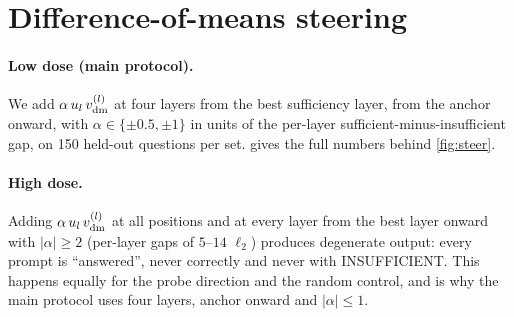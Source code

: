 \section{Difference-of-means steering}
\label{app:steer-dm}
\paragraph{Low dose (main protocol).} We add $\alpha\,u_l\,v_{\mathrm{dm}}^{(l)}$ at four layers from the best sufficiency layer, from the anchor onward, with $\alpha\in\{\pm0.5,\pm1\}$ in units of the per-layer sufficient-minus-insufficient gap, on 150 held-out questions per set.  gives the full numbers behind \cref{fig:steer}.
\begin{table}[h]
\centering\small

\caption{Low-dose steering along $\vdm$ (150 held-out questions per set). Baselines ($\alpha=0$) appear in \cref{fig:steer}.}
\label{tab:steer}
\end{table}

\paragraph{High dose.} Adding $\alpha\,u_l\,v_{\mathrm{dm}}^{(l)}$ at all positions and at every layer from the best layer onward with $|\alpha|\ge2$ (per-layer gaps of $5$--$14$ $\ell_2$) produces degenerate output: every prompt is ``answered'', never correctly and never with INSUFFICIENT. This happens equally for the probe direction and the random control, and is why the main protocol uses four layers, anchor onward and $|\alpha|\le1$.
